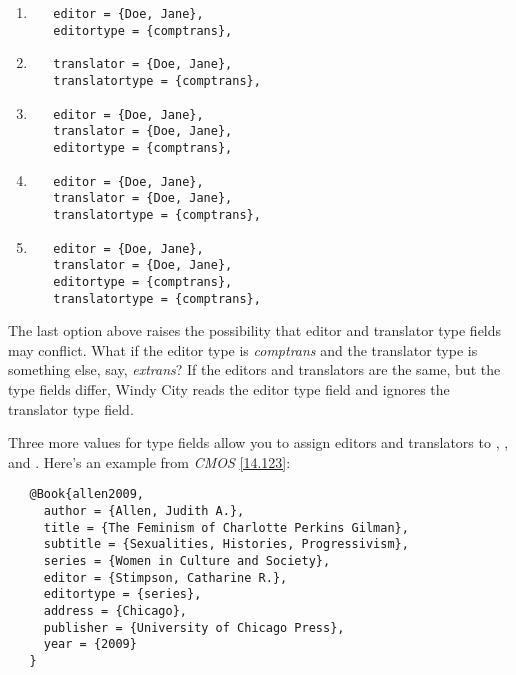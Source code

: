 \documentclass[11pt,letterpaper,oneside]{article}
\begin{document}
\begin{enumerate}[itemsep=0.2\baselineskip]

\item

\begin{verbatim}
   editor = {Doe, Jane},
   editortype = {comptrans},
\end{verbatim}

\item

\begin{verbatim}
   translator = {Doe, Jane},
   translatortype = {comptrans},
\end{verbatim}

\item

\begin{verbatim}
   editor = {Doe, Jane},
   translator = {Doe, Jane},
   editortype = {comptrans},
\end{verbatim}

\item

\begin{verbatim}
   editor = {Doe, Jane},
   translator = {Doe, Jane},
   translatortype = {comptrans},
\end{verbatim}

\item

\begin{verbatim}
   editor = {Doe, Jane},
   translator = {Doe, Jane},
   editortype = {comptrans},
   translatortype = {comptrans},
\end{verbatim}

\end{enumerate}

The last option above raises the possibility that editor and
translator type fields may conflict. What if the editor type is
\textit{comptrans} and the translator type is something else, say,
\textit{extrans}? If the editors and translators are the same, but the
type fields differ, Windy City reads the editor type field and ignores
the translator type field.

Three more values for type fields allow you to assign editors and
translators to , , and
. Here's an example from \textit{CMOS}
\ref{14.123}:

\begin{verbatim}
   @Book{allen2009,
     author = {Allen, Judith A.},
     title = {The Feminism of Charlotte Perkins Gilman},
     subtitle = {Sexualities, Histories, Progressivism},
     series = {Women in Culture and Society},
     editor = {Stimpson, Catharine R.},
     editortype = {series},
     address = {Chicago},
     publisher = {University of Chicago Press},
     year = {2009}
   }
\end{verbatim}
\end{document}
